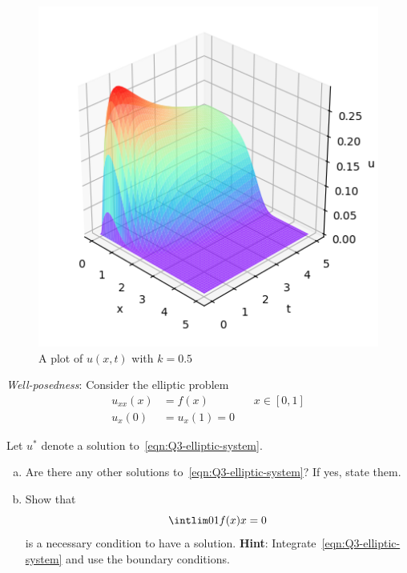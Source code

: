 \documentclass[a4paper]{article}
\begin{document}
\begin{figure}[h]
    \centering
    \includegraphics[scale=0.8]{Q2}
    \caption{A plot of $u(x, t)$ with $k=0.5$}
\end{figure}



\begin{questionbody}
\textit{Well-posedness}: Consider the elliptic problem \begin{align*}
u_{xx}(x) &= f(x) \qquad\qquad x \in [0, 1] \tag{\dagger}\label{eqn:Q3-elliptic-system} \\
u_x(0) &= u_x(1) = 0
\end{align*}

Let $u^*$ denote a solution to~\eqref{eqn:Q3-elliptic-system}.
\begin{enumerate}[(a)]
\item Are there any other solutions to~\eqref{eqn:Q3-elliptic-system}? If yes, state them.
\item Show that \[ \intlim 0 1 {f(x)} x = 0 \] is a necessary condition to have a solution. \textbf{Hint}: Integrate~\eqref{eqn:Q3-elliptic-system} and use the boundary conditions.
\end{enumerate}
\end{questionbody}

\subsection{~} %
\end{document}
